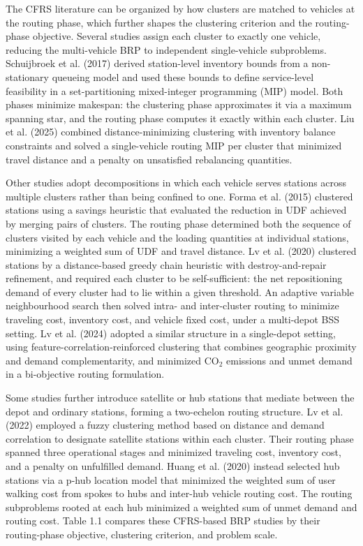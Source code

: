 \documentclass[11pt]{article}
\numberwithin{table}{section}
\numberwithin{figure}{section}
\begin{document}
The CFRS literature can be organized by how clusters are matched to vehicles at the routing phase, which further shapes the clustering criterion and the routing-phase objective. Several studies assign each cluster to exactly one vehicle, reducing the multi-vehicle BRP to independent single-vehicle subproblems. Schuijbroek et al. (2017) derived station-level inventory bounds from a non-stationary queueing model and used these bounds to define service-level feasibility in a set-partitioning mixed-integer programming (MIP) model. Both phases minimize makespan: the clustering phase approximates it via a maximum spanning star, and the routing phase computes it exactly within each cluster. Liu et al. (2025) combined distance-minimizing clustering with inventory balance constraints and solved a single-vehicle routing MIP per cluster that minimized travel distance and a penalty on unsatisfied rebalancing quantities.

Other studies adopt decompositions in which each vehicle serves stations across multiple clusters rather than being confined to one. Forma et al. (2015) clustered stations using a savings heuristic that evaluated the reduction in UDF achieved by merging pairs of clusters. The routing phase determined both the sequence of clusters visited by each vehicle and the loading quantities at individual stations, minimizing a weighted sum of UDF and travel distance. Lv et al. (2020) clustered stations by a distance-based greedy chain heuristic with destroy-and-repair refinement, and required each cluster to be self-sufficient: the net repositioning demand of every cluster had to lie within a given threshold. An adaptive variable neighbourhood search then solved intra- and inter-cluster routing to minimize traveling cost, inventory cost, and vehicle fixed cost, under a multi-depot BSS setting. Lv et al. (2024) adopted a similar structure in a single-depot setting, using feature-correlation-reinforced clustering that combines geographic proximity and demand complementarity, and minimized CO$_2$ emissions and unmet demand in a bi-objective routing formulation.

Some studies further introduce satellite or hub stations that mediate between the depot and ordinary stations, forming a two-echelon routing structure. Lv et al. (2022) employed a fuzzy clustering method based on distance and demand correlation to designate satellite stations within each cluster. Their routing phase spanned three operational stages and minimized traveling cost, inventory cost, and a penalty on unfulfilled demand. Huang et al. (2020) instead selected hub stations via a p-hub location model that minimized the weighted sum of user walking cost from spokes to hubs and inter-hub vehicle routing cost. The routing subproblems rooted at each hub minimized a weighted sum of unmet demand and routing cost. Table 1.1 compares these CFRS-based BRP studies by their routing-phase objective, clustering criterion, and problem scale.
\end{document}
